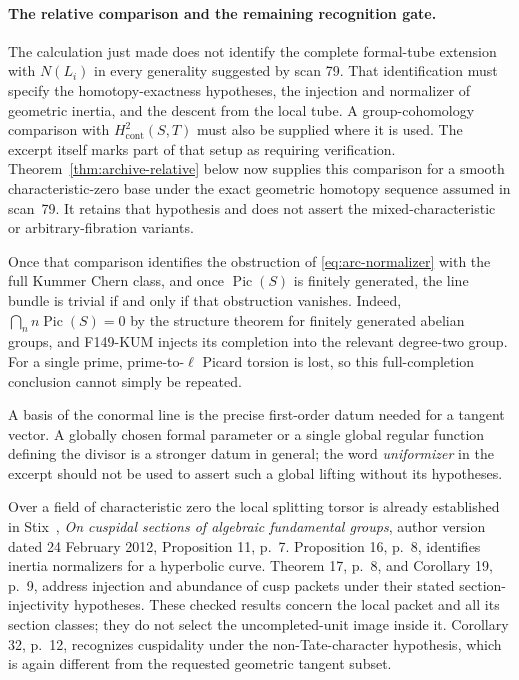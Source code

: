 \paragraph{The relative comparison and the remaining recognition gate.}
The calculation just made does not identify the complete formal-tube
extension with \(N(L_i)\) in every generality suggested by scan 79.
That identification must specify the homotopy-exactness hypotheses,
the injection and normalizer of geometric inertia, and the descent
from the local tube.  A group-cohomology comparison with
\(H^2_{\mathrm{cont}}(S,T)\) must also be supplied where it is used.
The excerpt itself marks part of that setup as requiring verification.
Theorem~\ref{thm:archive-relative} below now supplies this comparison for a smooth characteristic-zero base under the exact geometric homotopy sequence assumed in scan~79. It retains that hypothesis and does not assert the mixed-characteristic or arbitrary-fibration variants.

Once that comparison identifies the obstruction of
\eqref{eq:arc-normalizer} with the full Kummer Chern class, and once
\(\operatorname{Pic}(S)\) is finitely generated, the line bundle is
trivial if and only if that obstruction vanishes.  Indeed,
\(\bigcap_n n\operatorname{Pic}(S)=0\) by the structure theorem for
finitely generated abelian groups, and F149-KUM injects its completion
into the relevant degree-two group.  For a single prime, prime-to-\(\ell\)
Picard torsion is lost, so this full-completion conclusion cannot
simply be repeated.

A basis of the conormal line is the precise first-order datum needed
for a tangent vector.  A globally chosen formal parameter or a single
global regular function defining the divisor is a stronger datum in
general; the word \emph{uniformizer} in the excerpt should not be used
to assert such a global lifting without its hypotheses.

Over a field of characteristic zero the local splitting torsor is
already established in Stix~\cite{StixCuspidal2012}, \emph{On cuspidal sections of algebraic
fundamental groups}, author version dated 24 February 2012,
Proposition 11, p.~7.  Proposition 16, p.~8, identifies inertia
normalizers for a hyperbolic curve.  Theorem 17, p.~8, and Corollary 19,
p.~9, address injection and abundance of cusp packets under their
stated section-injectivity hypotheses.  These checked results concern
the local packet and all its section classes; they do not select the
uncompleted-unit image inside it.  Corollary 32, p.~12, recognizes
cuspidality under the non-Tate-character hypothesis, which is again
different from the requested geometric tangent subset.

